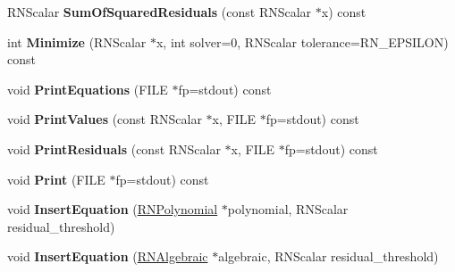 \begin{DoxyCompactItemize}
\item 
R\+N\+Scalar {\bfseries Sum\+Of\+Squared\+Residuals} (const R\+N\+Scalar $\ast$x) const \hypertarget{class_r_n_system_of_equations_a580e01fb2dc9694e396727f657846ba4}{}\label{class_r_n_system_of_equations_a580e01fb2dc9694e396727f657846ba4}

\item 
int {\bfseries Minimize} (R\+N\+Scalar $\ast$x, int solver=0, R\+N\+Scalar tolerance=R\+N\+\_\+\+E\+P\+S\+I\+L\+ON) const \hypertarget{class_r_n_system_of_equations_a1ea6720f070e506fa6e71206f9f14577}{}\label{class_r_n_system_of_equations_a1ea6720f070e506fa6e71206f9f14577}

\item 
void {\bfseries Print\+Equations} (F\+I\+LE $\ast$fp=stdout) const \hypertarget{class_r_n_system_of_equations_aee408ac39e61f36777a85ac62f7ffddc}{}\label{class_r_n_system_of_equations_aee408ac39e61f36777a85ac62f7ffddc}

\item 
void {\bfseries Print\+Values} (const R\+N\+Scalar $\ast$x, F\+I\+LE $\ast$fp=stdout) const \hypertarget{class_r_n_system_of_equations_aeb72403e53f7e988ae8fd8d68644adb9}{}\label{class_r_n_system_of_equations_aeb72403e53f7e988ae8fd8d68644adb9}

\item 
void {\bfseries Print\+Residuals} (const R\+N\+Scalar $\ast$x, F\+I\+LE $\ast$fp=stdout) const \hypertarget{class_r_n_system_of_equations_a811a800e1de3351fd9126722aa3e6114}{}\label{class_r_n_system_of_equations_a811a800e1de3351fd9126722aa3e6114}

\item 
void {\bfseries Print} (F\+I\+LE $\ast$fp=stdout) const \hypertarget{class_r_n_system_of_equations_a6efd7fb2463203d8112bedf045ff2a61}{}\label{class_r_n_system_of_equations_a6efd7fb2463203d8112bedf045ff2a61}

\item 
void {\bfseries Insert\+Equation} (\hyperlink{class_r_n_polynomial}{R\+N\+Polynomial} $\ast$polynomial, R\+N\+Scalar residual\+\_\+threshold)\hypertarget{class_r_n_system_of_equations_a9073e14f68c356a855f67fe8574cc4d6}{}\label{class_r_n_system_of_equations_a9073e14f68c356a855f67fe8574cc4d6}

\item 
void {\bfseries Insert\+Equation} (\hyperlink{class_r_n_algebraic}{R\+N\+Algebraic} $\ast$algebraic, R\+N\+Scalar residual\+\_\+threshold)\hypertarget{class_r_n_system_of_equations_a2f6378d83a6bcd4713b26564961441ff}{}\label{class_r_n_system_of_equations_a2f6378d83a6bcd4713b26564961441ff}

\end{DoxyCompactItemize}
